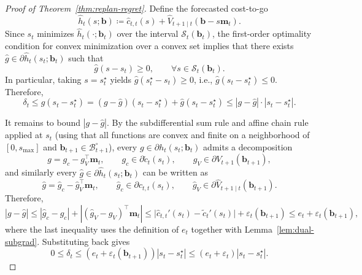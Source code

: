 \documentclass{uai2026} %
\newcommand{\1}{\mathbf{1}}
\newcommand{\scalt}{\mathcal{S}_{t}}
\renewcommand{\epsilon}{\varepsilon}
\newcommand{\bcal}{\mathcal{B}}
\begin{document}
\begin{proof}[Proof of Theorem~\ref{thm:replan-regret}]
  Define the forecasted cost-to-go
  \begin{equation*}
    \hat{h}_t(s;\mathbf{b})
    \coloneqq
    \hat{c}_{t,t}(s)+\hat{V}_{t+1\mid t}(\mathbf{b}-s\mathbf{m}_t).
  \end{equation*}
  Since $s_t$ minimizes $\hat{h}_t(\cdot;\mathbf{b}_t)$ over the interval $\scalt(\mathbf{b}_t)$, the first-order optimality condition for convex minimization over a convex set implies that there exists $\hat{g}\in\partial \hat{h}_t(s_t;\mathbf{b}_t)$ such that
  \begin{equation*}
    \hat{g}(s-s_t)\ge 0,\qquad \forall s\in\scalt(\mathbf{b}_t).
  \end{equation*}
  In particular, taking $s=s_t^{\star}$ yields $\hat{g}(s_t^{\star}-s_t)\ge 0$, i.e., $\hat{g}(s_t-s_t^{\star})\le 0$.
  Therefore,
  \begin{equation*}
    \delta_t
    \le g(s_t-s_t^{\star})
    = (g-\hat{g})(s_t-s_t^{\star})+\hat{g}(s_t-s_t^{\star})
    \le |g-\hat{g}|\cdot |s_t-s_t^{\star}|.
  \end{equation*}

  It remains to bound $|g-\hat{g}|$.
  By the subdifferential sum rule and affine chain rule applied at $s_t$ (using that all functions are convex and finite on a neighborhood of $[0,s_{\max}]$ and $\mathbf{b}_{t+1}\in\bcal_{t+1}^{\circ}$), every $g\in\partial h_t(s_t;\mathbf{b}_t)$ admits a decomposition
  \begin{equation*}
    g = g_c - g_V^{\top}\mathbf{m}_t,
    \qquad
    g_c\in\partial \tilde{c}_t(s_t),
    \qquad
    g_V\in\partial V_{t+1}(\mathbf{b}_{t+1}),
  \end{equation*}
  and similarly every $\hat{g}\in\partial \hat{h}_t(s_t;\mathbf{b}_t)$ can be written as
  \begin{equation*}
    \hat{g} = \hat{g}_c - \hat{g}_V^{\top}\mathbf{m}_t,
    \qquad
    \hat{g}_c\in\partial \hat{c}_{t,t}(s_t),
    \qquad
    \hat{g}_V\in\partial \hat{V}_{t+1\mid t}(\mathbf{b}_{t+1}).
  \end{equation*}
  Therefore,
  \begin{equation*}
    |g-\hat{g}|
    \le |\hat{g}_c-g_c| + |(\hat{g}_V-g_V)^{\top}\mathbf{m}_t|
    \le \bigl|\hat{c}_{t,t}'(s_t)-\tilde{c}_t'(s_t)\bigr|+\epsilon_t(\mathbf{b}_{t+1})
    \le e_t+\epsilon_t(\mathbf{b}_{t+1}),
  \end{equation*}
  where the last inequality uses the definition of $e_t$ together with Lemma~\ref{lem:dual-subgrad}.
  Substituting back gives
  \begin{equation*}
    0\le \delta_t \le \left(e_t+\epsilon_t(\mathbf{b}_{t+1})\right)|s_t-s_t^{\star}|
    \le (e_t+\epsilon_t)|s_t-s_t^{\star}|.
  \end{equation*}


\end{proof}
\end{document}
